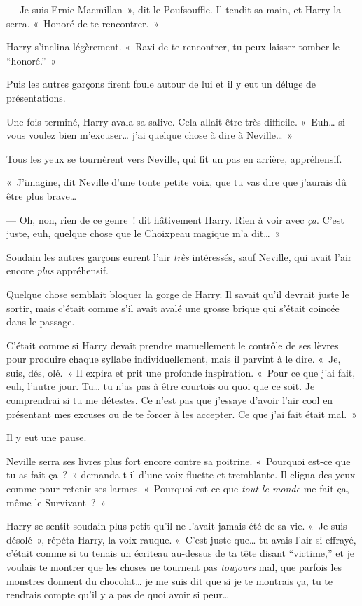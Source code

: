 --- Je suis Ernie Macmillan~», dit le Poufsouffle.
Il tendit sa main, et Harry la serra.
«~Honoré de te rencontrer.~»

Harry s'inclina légèrement.
«~Ravi de te rencontrer, tu peux laisser tomber le “honoré.”~»

Puis les autres garçons firent foule autour de lui et il y eut un déluge de présentations.

Une fois terminé, Harry avala sa salive.
Cela allait être très difficile.
«~Euh… si vous voulez bien m'excuser… j'ai quelque chose à dire à Neville…~»

Tous les yeux se tournèrent vers Neville, qui fit un pas en arrière, appréhensif.

«~J'imagine, dit Neville d'une toute petite voix, que tu vas dire que j'aurais dû être plus brave…

--- Oh, non, rien de ce genre~! dit hâtivement Harry.
Rien à voir avec \emph{ça}.
C'est juste, euh, quelque chose que le Choixpeau magique m'a dit…~»

Soudain les autres garçons eurent l'air \emph{très} intéressés, sauf Neville, qui avait l'air encore \emph{plus} appréhensif.

Quelque chose semblait bloquer la gorge de Harry.
Il savait qu'il devrait juste le sortir, mais c'était comme s'il avait avalé une grosse brique qui s'était coincée dans le passage.

C'était comme si Harry devait prendre manuellement le contrôle de ses lèvres pour produire chaque syllabe individuellement, mais il parvint à le dire.
«~Je, suis, dés, olé.~»
Il expira et prit une profonde inspiration.
«~Pour ce que j'ai fait, euh, l'autre jour.
Tu… tu n'as pas à être courtois ou quoi que ce soit.
Je comprendrai si tu me détestes.
Ce n'est pas que j'essaye d'avoir l'air cool en présentant mes excuses ou de te forcer à les accepter.
Ce que j'ai fait était mal.~»

Il y eut une pause.

Neville serra ses livres plus fort encore contre sa poitrine.
«~Pourquoi est-ce que tu as fait ça~?~» demanda-t-il d'une voix fluette et tremblante.
Il cligna des yeux comme pour retenir ses larmes.
«~Pourquoi est-ce que \emph{tout le monde} me fait ça, même le Survivant~?~»

Harry se sentit soudain plus petit qu'il ne l'avait jamais été de sa vie.
«~Je suis désolé~», répéta Harry, la voix rauque.
«~C'est juste que… tu avais l'air si effrayé, c'était comme si tu tenais un écriteau au-dessus de ta tête disant “victime,” et je voulais te montrer que les choses ne tournent pas \emph{toujours} mal, que parfois les monstres donnent du chocolat… je me suis dit que si je te montrais ça, tu te rendrais compte qu'il y a pas de quoi avoir si peur…

